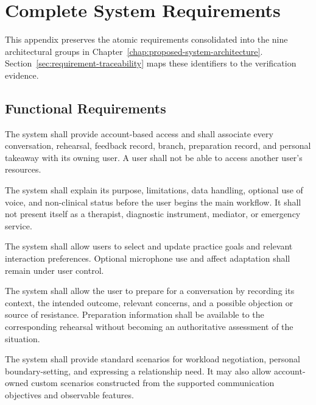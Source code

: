 \chapter{Complete System Requirements}
\label{app:complete-requirements}

This appendix preserves the atomic requirements consolidated into the nine architectural groups in Chapter~\ref{chap:proposed-system-architecture}. Section~\ref{sec:requirement-traceability} maps these identifiers to the verification evidence.

\section{Functional Requirements}

\begin{description}[leftmargin=!,labelwidth=3.7cm,style=nextline]
    \item[\textbf{FR1. User authentication and ownership}]
    The system shall provide account-based access and shall associate every conversation, rehearsal, feedback record, branch, preparation record, and personal takeaway with its owning user. A user shall not be able to access another user's resources.

    \item[\textbf{FR2. Onboarding and disclosure}]
    The system shall explain its purpose, limitations, data handling, optional use of voice, and non-clinical status before the user begins the main workflow. It shall not present itself as a therapist, diagnostic instrument, mediator, or emergency service.

    \item[\textbf{FR3. User preferences and practice goals}]
    The system shall allow users to select and update practice goals and relevant interaction preferences. Optional microphone use and affect adaptation shall remain under user control.

    \item[\textbf{FR4. Scenario preparation}]
    The system shall allow the user to prepare for a conversation by recording its context, the intended outcome, relevant concerns, and a possible objection or source of resistance. Preparation information shall be available to the corresponding rehearsal without becoming an authoritative assessment of the situation.

    \item[\textbf{FR5. Scenario selection}]
    The system shall provide standard scenarios for workload negotiation, personal boundary-setting, and expressing a relationship need. It may also allow account-owned custom scenarios constructed from the supported communication objectives and observable features.


\end{description}
